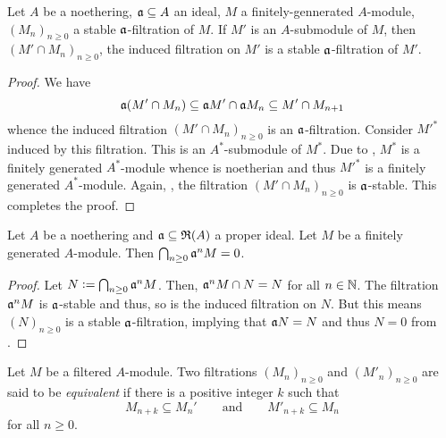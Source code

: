 \begin{lemma}
    Let $A$ be a noethering, $\mathfrak a\subseteq A$ an ideal, $M$ a finitely-gennerated $A$-module, $(M_n)_{n\ge 0}$ a stable $\mathfrak a$-filtration of $M$. If $M'$ is an $A$-submodule of $M$, then $(M'\cap M_n)_{n\ge 0}$, the induced filtration on $M'$ is a stable $\mathfrak a$-filtration of $M'$.
\end{lemma}
\begin{proof}
    We have 
    \begin{equation*}
        \mathfrak a(M'\cap M_n)\subseteq\mathfrak a M'\cap\mathfrak a M_n\subseteq M'\cap M_{n + 1}
    \end{equation*}
    whence the induced filtration $(M'\cap M_n)_{n\ge 0}$ is an $\mathfrak a$-filtration. Consider $M'^\ast$ induced by this filtration. This is an $A^\ast$-submodule of $M^\ast$. Due to , $M^\ast$ is a finitely generated $A^\ast$-module whence is noetherian and thus $M'^\ast$ is a finitely generated $A^\ast$-module. Again, , the filtration $(M'\cap M_n)_{n\ge 0}$ is $\mathfrak a$-stable. This completes the proof.
\end{proof}

\begin{corollary}
    Let $A$ be a noethering and $\mathfrak a\subseteq\mathfrak R(A)$ a proper ideal. Let $M$ be a finitely generated $A$-module. Then $\bigcap_{n\ge 0}\mathfrak a^nM=0$.
\end{corollary}
\begin{proof}
    Let $N := \bigcap_{n\ge 0}\mathfrak a^n M$. Then, $\mathfrak a^nM\cap N = N$ for all $n\in\mathbb{N}$. The filtration $\mathfrak a^nM$ is $\mathfrak a$-stable and thus, so is the induced filtration on $N$. But this means $(N)_{n\ge 0}$ is a stable $\mathfrak a$-filtration, implying that $\mathfrak a N = N$ and thus $N = 0$ from .
\end{proof}

\begin{definition}
    Let $M$ be a filtered $A$-module. Two filtrations $(M_n)_{n\ge 0}$ and $(M'_n)_{n\ge 0}$ are said to be \emph{equivalent} if there is a positive integer $k$ such that 
    \begin{equation*}
        M_{n + k}\subseteq M_n'\qquad\text{and}\qquad M'_{n + k}\subseteq M_n
    \end{equation*}
    for all $n\ge 0$.
\end{definition}

